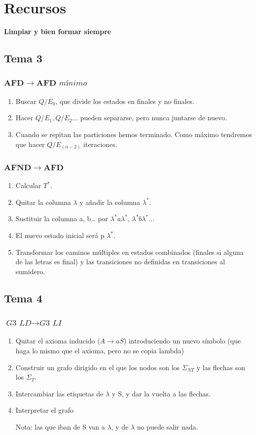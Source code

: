 \documentclass[12pt, twoside, openright]{report} %
\begin{document}
\chapter{Recursos}
\textbf{Limpiar y bien formar siempre}
\section{Tema 3}
\subsection{$\boldsymbol{AFD \rightarrow AFD} \textit{ mínimo}$}
\begin{enumerate}
	\item Buscar $Q/E_0$, que divide los estados en finales y no finales.
	\item Hacer $Q/E_1, Q/E_2...$ pueden separarse, pero nunca juntarse de nuevo.
	\item Cuando se repitan las particiones hemos terminado. Como máximo tendremos que hacer $Q/E_{(n-2)}$ iteraciones.
\end{enumerate}

\subsection{$\boldsymbol{AFND \rightarrow AFD}$}
\begin{enumerate}
	\item Calcular $T^*$.
	\item Quitar la columna $\lambda$ y añadir la columna $\lambda^*$.
	\item Sustituir la columna a, b… por $\lambda^* a \lambda^*$, $\lambda^* b \lambda^*$...
	\item El nuevo estado inicial será p $\lambda^*$.
	\item Transformar los caminos múltiples en estados combinados (finales si alguna de las letras es final) y las transiciones no definidas en transiciones al sumidero.
\end{enumerate}

\section{Tema 4}
\subsection{$\boldsymbol{\textit{G3 LD} \rightarrow \textit{G3 LI}}$}
\begin{enumerate}
	\item Quitar el axioma inducido ($A \rightarrow aS$) introduciendo un nuevo símbolo (que haga lo mismo que el axioma, pero no se copia lambda)
	\item Construir un grafo dirigido en el que los nodos son los $\Sigma_{NT}$ y las flechas son los $\Sigma_T$.
	\item Intercambiar las etiquetas de $\lambda$ y S, y dar la vuelta a las flechas.
	\item Interpretar el grafo
	
	Nota: las que iban de S van a $\lambda$, y de $\lambda$ no puede salir nada.
\end{enumerate}
\end{document}
